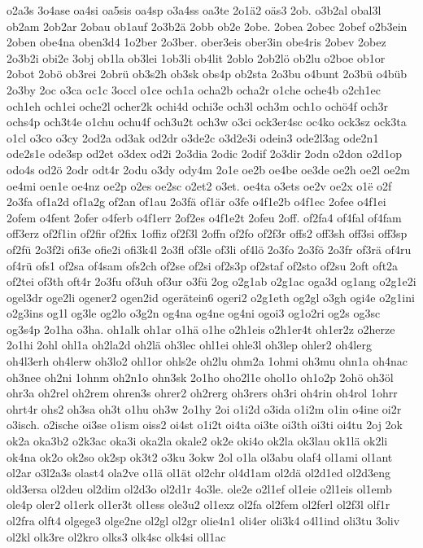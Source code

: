{o2a3s
3o4ase
oa4si
oa5sis
oa4sp
o3a4ss
oa3te
2o1ä2
oäs3
2ob.
o3b2al
obal3l
ob2am
2ob2ar
2obau
ob1auf
2o3b2ä
2obb
ob2e
2obe.
2obea
2obec
2obef
o2b3ein
2oben
obe4na
oben3d4
1o2ber
2o3ber.
ober3eis
ober3in
obe4ris
2obev
2obez
2o3b2i
obi2e
3obj
ob1la
ob3lei
1ob3li
ob4lit
2oblo
2ob2lö
ob2lu
o2boe
ob1or
2obot
2obö
ob3rei
2obrü
ob3s2h
ob3sk
obs4p
ob2sta
2o3bu
o4bunt
2o3bü
o4büb
2o3by
2oc
o3ca
oc1c
3occl
o1ce
och1a
ocha2b
ocha2r
o1che
oche4b
o2ch1ec
och1eh
och1ei
oche2l
ocher2k
ochi4d
ochi3e
och3l
och3m
och1o
ochö4f
och3r
ochs4p
och3t4e
o1chu
ochu4f
och3u2t
och3w
o3ci
ock3er4sc
oc4ko
ock3sz
ock3ta
o1cl
o3co
o3cy
2od2a
od3ak
od2dr
o3de2c
o3d2e3i
odein3
ode2l3ag
ode2n1
ode2s1e
ode3sp
od2et
o3dex
od2i
2o3dia
2odic
2odif
2o3dir
2odn
o2don
o2d1op
odo4s
od2ö
2odr
odt4r
2odu
o3dy
ody4m
2o1e
oe2b
oe4be
oe3de
oe2h
oe2l
oe2m
oe4mi
oen1e
oe4nz
oe2p
o2es
oe2sc
o2et2
o3et.
oe4ta
o3ets
oe2v
oe2x
o1ë
o2f
2o3fa
of1a2d
of1a2g
of2an
of1au
2o3fä
of1är
o3fe
o4f1e2b
o4f1ec
2ofee
o4f1ei
2ofem
o4fent
2ofer
o4ferb
o4f1err
2of2es
o4f1e2t
2ofeu
2off.
of2fa4
of4fal
of4fam
off3erz
of2f1in
of2fir
of2fix
1offiz
of2f3l
2offn
of2fo
of2f3r
offs2
off3sh
off3si
off3sp
of2fü
2o3f2i
ofi3e
ofie2i
ofi3k4l
2o3fl
of3le
of3li
of4lö
2o3fo
2o3fö
2o3fr
of3rä
of4ru
of4rü
ofs1
of2sa
of4sam
ofs2ch
of2se
of2si
of2s3p
of2staf
of2sto
of2su
2oft
oft2a
of2tei
of3th
oft4r
2o3fu
of3uh
of3ur
o3fü
2og
o2g1ab
o2g1ac
oga3d
og1ang
o2g1e2i
ogel3dr
oge2li
ogener2
ogen2id
ogerätein6
ogeri2
o2g1eth
og2gl
o3gh
ogi4e
o2g1ini
o2g3ins
og1l
og3le
og2lo
o3g2n
og4na
og4ne
og4ni
ogoi3
og1o2ri
og2s
og3sc
og3s4p
2o1ha
o3ha.
oh1alk
oh1ar
o1hä
o1he
o2h1eis
o2h1er4t
oh1er2z
o2herze
2o1hi
2ohl
ohl1a
oh2la2d
oh2lä
oh3lec
ohl1ei
ohle3l
oh3lep
ohler2
oh4lerg
oh4l3erh
oh4lerw
oh3lo2
ohl1or
ohls2e
oh2lu
ohm2a
1ohmi
oh3mu
ohn1a
oh4nac
oh3nee
oh2ni
1ohnm
oh2n1o
ohn3sk
2o1ho
oho2l1e
ohol1o
oh1o2p
2ohö
oh3öl
ohr3a
oh2rel
oh2rem
ohren3s
ohrer2
oh2rerg
oh3rers
oh3ri
oh4rin
oh4rol
1ohrr
ohrt4r
ohs2
oh3sa
oh3t
o1hu
oh3w
2o1hy
2oi
o1i2d
o3ida
o1i2m
o1in
o4ine
oi2r
o3isch.
o2ische
oi3se
o1ism
oiss2
oi4st
o1i2t
oi4ta
oi3te
oi3th
oi3ti
oi4tu
2oj
2ok
ok2a
oka3b2
o2k3ac
oka3i
oka2la
okale2
ok2e
oki4o
ok2la
ok3lau
ok1lä
ok2li
ok4na
ok2o
ok2so
ok2sp
ok3t2
o3ku
3okw
2ol
o1la
ol3abu
olaf4
ol1ami
ol1ant
ol2ar
o3l2a3s
olast4
ola2ve
o1lä
ol1ät
ol2chr
ol4d1am
ol2dä
ol2d1ed
ol2d3eng
old3ersa
ol2deu
ol2dim
ol2d3o
ol2d1r
4o3le.
ole2e
o2l1ef
ol1eie
o2l1eis
ol1emb
ole4p
oler2
ol1erk
ol1er3t
ol1ess
ole3u2
ol1exz
ol2fa
ol2fem
ol2ferl
ol2f3l
olf1r
ol2fra
olft4
olgege3
olge2ne
ol2gl
ol2gr
olie4n1
oli4er
oli3k4
o4l1ind
oli3tu
3oliv
ol2kl
olk3re
ol2kro
olks3
olk4sc
olk4si
oll1ac
}
